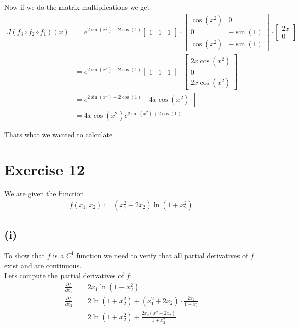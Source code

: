 \documentclass{article}
\begin{document}
Now if we do the matrix multiplications we get
\begin{align*}
   J(f_3 \circ f_2 \circ f_1)(x) &= e^{2\sin(x^2) + 2\cos(1)} \begin{bmatrix}
      1 & 1 & 1
   \end{bmatrix} \cdot \begin{bmatrix}
      \cos(x^2) & 0 \\
      0 & -\sin(1) \\
      \cos(x^2) & -\sin(1)
   \end{bmatrix} \cdot \begin{bmatrix}
      2x \\
      0
   \end{bmatrix} \\
   &= e^{2\sin(x^2) + 2\cos(1)} \begin{bmatrix}
      1 & 1 & 1
   \end{bmatrix} \cdot \begin{bmatrix}
      2x \cos(x^2) \\
      0 \\
      2x \cos(x^2)
   \end{bmatrix} \\
   &= e^{2\sin(x^2) + 2\cos(1)} \begin{bmatrix}
      4x \cos(x^2)
   \end{bmatrix} \\
   &= 4x \cos(x^2) e^{2\sin(x^2) + 2\cos(1)}
\end{align*}

Thats what we wanted to calculate

\section*{Exercise 12}
We are given the function
\begin{align*}
   f(x_1, x_2) := (x_1^2 + 2x_2) \ln(1 + x_2^2)
\end{align*}

\subsection*{(i)}
To show that \(f\) is a \(C^1\) function we need to verify that all partial derivatives of \(f\) exist and are continuous. \\
Lets compute the partial derivatives of \(f\):
\begin{align*}
   \frac{\partial f}{\partial x_1} &= 2x_1 \ln(1 + x_2^2) \\
   \frac{\partial f}{\partial x_2} &= 2 \ln(1 + x_2^2) + (x_1^2 + 2x_2) \cdot \frac{2x_2}{1 + x_2^2} \\
   &= 2 \ln(1 + x_2^2) + \frac{2x_2 (x_1^2 + 2x_2)}{1 + x_2^2}
\end{align*}
\end{document}
